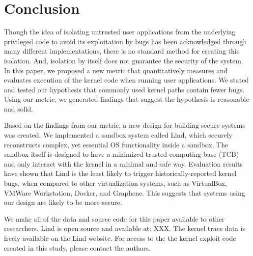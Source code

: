 \section{Conclusion}
\label{sec.conclusion}

Though the idea of isolating untrusted user applications from the underlying privileged code 
to avoid its exploitation by bugs has been acknowledged through many different implementations, 
there is no standard method for creating this isolation. 
And, isolation by itself does not guarantee the security of the system.
%
In this paper, we proposed a new metric that quantitatively measures and 
evaluates execution of the kernel code when running user applications. 
We stated and tested our hypothesis that commonly used kernel paths contain fewer bugs. 
Using our metric, we generated findings that suggest the hypothesis is reasonable and solid.

Based on the findings from our metric, a new design for building secure systems was created. 
We implemented a sandbox system called Lind, which securely reconstructs complex, 
yet essential OS functionality inside a sandbox. The sandbox itself is designed to 
have a minimized trusted computing base (TCB) and only interact with the kernel in a minimal and safe way. 
%
Evaluation results have shown that Lind is the least likely to trigger historically-reported kernel bugs, 
when compared to other virtualization systems, such as VirtualBox, VMWare Workstation, Docker, and Graphene. 
This suggests that systems using our design
are likely to be more secure.

We make all of the data and source code for this paper available to other 
researchers.  Lind is open source and available at: XXX.  The kernel 
trace data is freely available on the Lind website.  For access
to the the kernel exploit code created in this study, please contact the 
authors.


